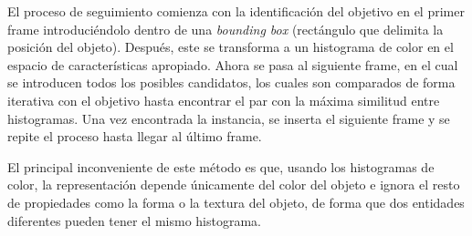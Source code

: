     El proceso de seguimiento comienza con la identificación del objetivo en el primer frame introduciéndolo dentro de una \textit{bounding box} (rectángulo que delimita la posición del objeto). Después, este se transforma a un histograma de color en el espacio de características apropiado. Ahora se pasa al siguiente frame, en el cual se introducen todos los posibles candidatos, los cuales son comparados de forma iterativa con el objetivo hasta encontrar el par con la máxima similitud entre histogramas. Una vez encontrada la instancia, se inserta el siguiente frame y se repite el proceso hasta llegar al último frame.

    El principal inconveniente de este método es que, usando los histogramas de color, la representación depende únicamente del color del objeto e ignora el resto de propiedades como la forma o la textura del objeto, de forma que dos entidades diferentes pueden tener el mismo histograma.
    

